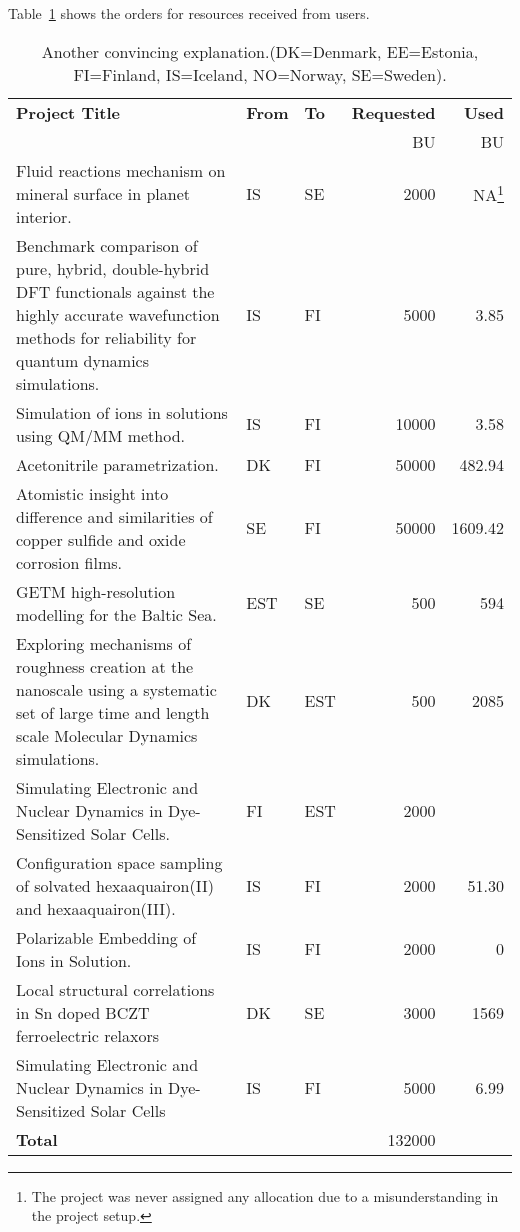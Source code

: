 Table~\ref{tab:projects} shows the orders for resources received from users.
\begin{table}
\begin{center}
\begin{tabular}{|p{7cm}|l|l|r|r|} \hline
\bf Project Title & \bf From & \bf To &\bf Requested &\bf Used \\
                  & & & BU & BU \\\hline
Fluid reactions mechanism on mineral surface in planet interior. & IS & SE & 2000 & NA\footnote{The project was never assigned any allocation due to a misunderstanding in the project setup.} \\
Benchmark comparison of pure, hybrid, double-hybrid DFT functionals against the highly accurate wavefunction methods for reliability for quantum dynamics simulations. & IS & FI & 5000 & 3.85 \\
Simulation of ions in solutions using QM/MM method. & IS & FI & 10000 & 3.58 \\
Acetonitrile parametrization. & DK & FI & 50000 & 482.94 \\
Atomistic insight into difference and similarities of copper sulfide and oxide corrosion films. & SE & FI & 50000 & 1609.42 \\
GETM high-resolution modelling for the Baltic Sea. & EST & SE & 500 & 594\\
Exploring mechanisms of roughness creation at the nanoscale using a systematic set of large time and length scale Molecular Dynamics simulations. & DK & EST & 500 & {2085}\\
Simulating Electronic and Nuclear Dynamics in Dye-Sensitized Solar Cells. & FI & EST & 2000 & \\
Configuration space sampling of solvated hexaaquairon(II) and hexaaquairon(III). & IS & FI & 2000 & 51.30 \\
Polarizable Embedding of Ions in Solution. & IS & FI & 2000 & 0 \\
Local structural correlations in Sn doped BCZT ferroelectric relaxors & DK & SE & 3000 & 1569\\
Simulating Electronic and Nuclear Dynamics in Dye-Sensitized Solar Cells & IS & FI & 5000 & 6.99 \\
\bf Total & & & 132000 & \\\hline
\end{tabular}
\caption{Another convincing explanation.(DK=Denmark, EE=Estonia, FI=Finland, IS=Iceland, NO=Norway, SE=Sweden). \label{tab:projects}}
\end{center}
\end{table}
